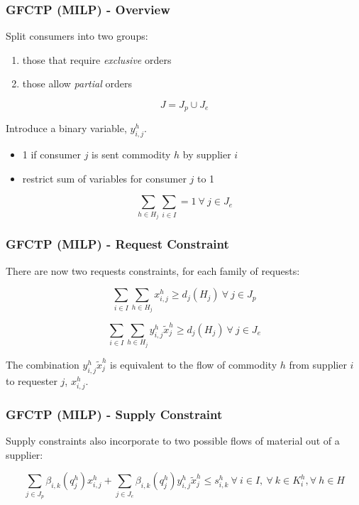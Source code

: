 \begin{frame}[ctb!]
  \frametitle{GFCTP (MILP) - Overview}

  Split consumers into two groups:
  \begin{enumerate}
    \item those that require \textit{exclusive} orders
    \item those allow \textit{partial} orders
  \end{enumerate}

  \begin{equation}\label{eqs:consumer-union}
    J = J_{p} \cup J_{e}
  \end{equation}

  Introduce a binary variable, $y_{i,j}^{h}$.  
  \begin{itemize}
    \item 1 if consumer $j$ is sent commodity $h$ by supplier $i$
    \item restrict sum of variables for consumer $j$ to 1
  \end{itemize}

  \begin{equation}
    \sum_{h \in H_j}\sum_{i \in I}  = 1
     \: \forall \: j \in J_{e}
  \end{equation}
  
\end{frame}

\begin{frame}[ctb!]
  \frametitle{GFCTP (MILP) - Request Constraint} 

  There are now two requests constraints, for each family of requests:

  \begin{equation}
    \sum_{i \in I}\sum_{h \in H_{j}} x_{i,j}^{h} \geq d_{j}(H_{j})
     \: \forall \: j \in J_{p}
  \end{equation}
  
  \begin{equation}    
    \sum_{i \in I}\sum_{h \in H_{j}} y_{i,j}^{h} \tilde{x}_{j}^{h} \geq d_{j}(H_{j}) 
     \: \forall \: j \in J_{e}
  \end{equation}

  The combination $y_{i,j}^{h} \tilde{x}_{j}^{h}$ is equivalent to the flow of
  commodity $h$ from supplier $i$ to requester $j$, $x^h_{i,j}$.
\end{frame}

\begin{frame}[ctb!]
  \frametitle{GFCTP (MILP) - Supply Constraint} 

  Supply constraints also incorporate to two possible flows of material out of a
  supplier:
  
  \begin{equation}    
    \sum_{j \in J_{p}}\beta_{i,k}(q_{j}^{h}) x_{i,j}^{h}
    + \sum_{j \in J_{e}}\beta_{i,k}(q_{j}^{h}) y_{i,j}^{h} \tilde{x}_{j}^{h} \leq s_{i,k}^{h}
     \: \forall \: i \in I, \: \forall \: k \in K_{i}^{h}, \forall \: {h \in H}
  \end{equation}
  
\end{frame}

